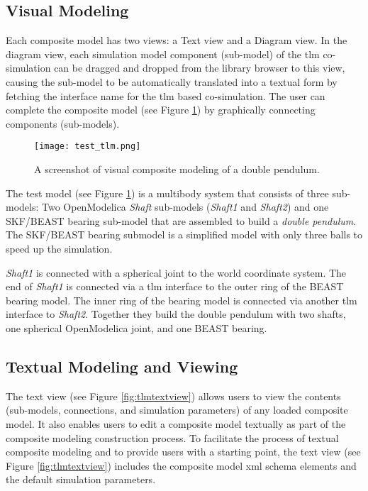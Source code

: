 \subsection{Visual Modeling}
\label{sec:tlmvisual}

Each composite model has two views: a Text view and a Diagram view. In the diagram view, each simulation
model component (sub-model) of the \acrshort{tlm} co-simulation can be dragged and dropped from the library browser to this view, causing the sub-model to be automatically translated into a textual form by fetching the interface name for the \acrshort{tlm} based co-simulation. The user can complete the composite model (see Figure \ref{fig:tlmtest}) by graphically connecting components (sub-models).

\begin{landscape}
\begin{figure}
	\texttt{[image: test\_tlm.png]}
	\caption{A screenshot of visual composite modeling of a double pendulum.}
	\label{fig:tlmtest}
\end{figure}
\end{landscape}

The test model (see Figure \ref{fig:tlmtest}) is a multibody system that consists of three sub-models: Two OpenModelica
\textit{Shaft} sub-models (\textit{Shaft1} and \textit{Shaft2}) and one SKF/BEAST bearing sub-model that are assembled to build a \textit{double pendulum}. The SKF/BEAST bearing submodel is a simplified model with only three balls to speed up the simulation. 

\textit{Shaft1} is connected with a spherical joint to the world coordinate system. The end of \textit{Shaft1} is connected via a \acrshort{tlm} interface to the outer ring of the BEAST bearing model. The inner ring of the bearing model is connected via another \acrshort{tlm} interface to \textit{Shaft2}. Together they build the double pendulum with two shafts, one spherical OpenModelica joint, and one BEAST bearing. 

\subsection{Textual Modeling and Viewing}
\label{sec:tlmtextual}

The text view (see Figure \ref{fig:tlmtextview}) allows users to view the contents (sub-models, connections, and simulation
parameters) of any loaded composite model. It also enables users to edit a composite model textually as
part of the composite modeling construction process. To facilitate the process of textual composite modeling
and to provide users with a starting point, the text view (see Figure \ref{fig:tlmtextview}) includes the composite model \acrshort{xml}
schema elements and the default simulation parameters. 

